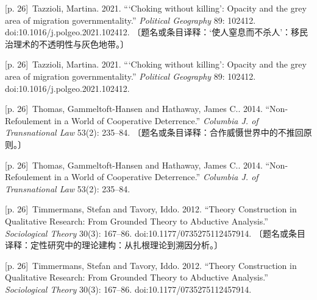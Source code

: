 \documentclass[10pt,a4paper]{article}
\begin{document}
\noindent\begin{minipage}{\textwidth}\begin{minipage}[t]{\dimexpr.5\textwidth-4mm\relax}{\scriptsize\color{gray} [p. 26]}\ Tazzioli, Martina. 2021. “‘Choking without killing’: Opacity and the grey area of migration governmentality.” \textit{Political Geography} 89: 102412. doi:10.1016/j.polgeo.2021.102412. 〔题名或条目译释：‘使人窒息而不杀人’：移民治理术的不透明性与灰色地带。〕\par\end{minipage}\hfill\begin{minipage}[t]{\dimexpr.5\textwidth-4mm\relax}{\scriptsize\color{gray} [p. 26]}\ Tazzioli, Martina. 2021. “‘Choking without killing’: Opacity and the grey area of migration governmentality.” \textit{Political Geography} 89: 102412. doi:10.1016/j.polgeo.2021.102412.\par\end{minipage}\end{minipage}\par
\noindent\begin{minipage}{\textwidth}\begin{minipage}[t]{\dimexpr.5\textwidth-4mm\relax}{\scriptsize\color{gray} [p. 26]}\ Thomas, Gammeltoft-Hansen and Hathaway, James C.. 2014. “Non-Refoulement in a World of Cooperative Deterrence.” \textit{Columbia J. of Transnational Law} 53(2): 235–84. 〔题名或条目译释：合作威慑世界中的不推回原则。〕\par\end{minipage}\hfill\begin{minipage}[t]{\dimexpr.5\textwidth-4mm\relax}{\scriptsize\color{gray} [p. 26]}\ Thomas, Gammeltoft-Hansen and Hathaway, James C.. 2014. “Non-Refoulement in a World of Cooperative Deterrence.” \textit{Columbia J. of Transnational Law} 53(2): 235–84.\par\end{minipage}\end{minipage}\par
\noindent\begin{minipage}{\textwidth}\begin{minipage}[t]{\dimexpr.5\textwidth-4mm\relax}{\scriptsize\color{gray} [p. 26]}\ Timmermans, Stefan and Tavory, Iddo. 2012. “Theory Construction in Qualitative Research: From Grounded Theory to Abductive Analysis.” \textit{Sociological Theory} 30(3): 167–86. doi:10.1177/0735275112457914. 〔题名或条目译释：定性研究中的理论建构：从扎根理论到溯因分析。〕\par\end{minipage}\hfill\begin{minipage}[t]{\dimexpr.5\textwidth-4mm\relax}{\scriptsize\color{gray} [p. 26]}\ Timmermans, Stefan and Tavory, Iddo. 2012. “Theory Construction in Qualitative Research: From Grounded Theory to Abductive Analysis.” \textit{Sociological Theory} 30(3): 167–86. doi:10.1177/0735275112457914.\par\end{minipage}\end{minipage}\par
\end{document}
